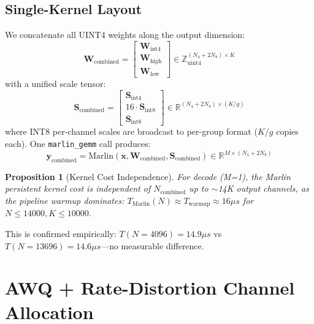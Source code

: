 \documentclass[11pt,a4paper]{article}
\newtheorem{proposition}{Proposition}
\begin{document}
\subsection{Single-Kernel Layout}

We concatenate all UINT4 weights along the output dimension:
\begin{equation}
    \mathbf{W}_{\text{combined}} = \begin{bmatrix} \mathbf{W}_{\text{int4}} \\ \mathbf{W}_{\text{high}} \\ \mathbf{W}_{\text{low}} \end{bmatrix} \in \mathbb{Z}^{(N_4 + 2N_8) \times K}_{\text{uint4}}
\end{equation}
with a unified scale tensor:
\begin{equation}
    \mathbf{S}_{\text{combined}} = \begin{bmatrix} \mathbf{S}_{\text{int4}} \\ 16 \cdot \mathbf{S}_{\text{int8}} \\ \mathbf{S}_{\text{int8}} \end{bmatrix} \in \mathbb{R}^{(N_4 + 2N_8) \times (K/g)}
\end{equation}
where INT8 per-channel scales are broadcast to per-group format ($K/g$ copies each). One \texttt{marlin\_gemm} call produces:
\begin{equation}
    \mathbf{y}_{\text{combined}} = \text{Marlin}(\mathbf{x}, \mathbf{W}_{\text{combined}}, \mathbf{S}_{\text{combined}}) \in \mathbb{R}^{M \times (N_4+2N_8)}
\end{equation}

\begin{proposition}[Kernel Cost Independence]
For decode (M=1), the Marlin persistent kernel cost is independent of $N_{\text{combined}}$ up to $\sim$14K output channels, as the pipeline warmup dominates:
$T_{\text{Marlin}}(N) \approx T_{\text{warmup}} \approx 16\mu s$ for $N \leq 14000, K \leq 10000$.
\end{proposition}

This is confirmed empirically: $T(N{=}4096) = 14.9\mu s$ vs $T(N{=}13696) = 14.6\mu s$---no measurable difference.


\section{AWQ + Rate-Distortion Channel Allocation}
\label{sec:allocation}
\end{document}
